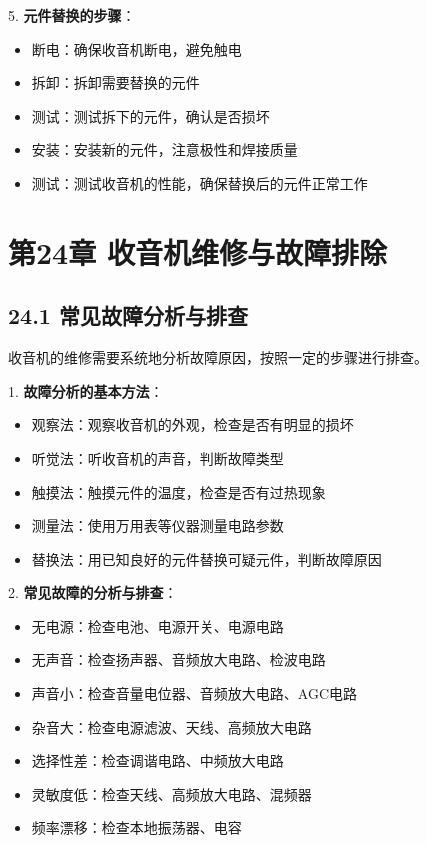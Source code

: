 \documentclass[12pt,UTF8]{ctexbook}
\begin{document}
5. \textbf{元件替换的步骤}：
   \begin{itemize}[leftmargin=3.5em]
   \item 断电：确保收音机断电，避免触电
   \item 拆卸：拆卸需要替换的元件
   \item 测试：测试拆下的元件，确认是否损坏
   \item 安装：安装新的元件，注意极性和焊接质量
   \item 测试：测试收音机的性能，确保替换后的元件正常工作
   \end{itemize}

\chapter*{第24章 收音机维修与故障排除}
\section*{24.1 常见故障分析与排查}

收音机的维修需要系统地分析故障原因，按照一定的步骤进行排查。

1. \textbf{故障分析的基本方法}：
   \begin{itemize}[leftmargin=3.5em]
   \item 观察法：观察收音机的外观，检查是否有明显的损坏
   \item 听觉法：听收音机的声音，判断故障类型
   \item 触摸法：触摸元件的温度，检查是否有过热现象
   \item 测量法：使用万用表等仪器测量电路参数
   \item 替换法：用已知良好的元件替换可疑元件，判断故障原因
   \end{itemize}

2. \textbf{常见故障的分析与排查}：
   \begin{itemize}[leftmargin=3.5em]
   \item 无电源：检查电池、电源开关、电源电路
   \item 无声音：检查扬声器、音频放大电路、检波电路
   \item 声音小：检查音量电位器、音频放大电路、AGC电路
   \item 杂音大：检查电源滤波、天线、高频放大电路
   \item 选择性差：检查调谐电路、中频放大电路
   \item 灵敏度低：检查天线、高频放大电路、混频器
   \item 频率漂移：检查本地振荡器、电容
   \end{itemize}
\end{document}
